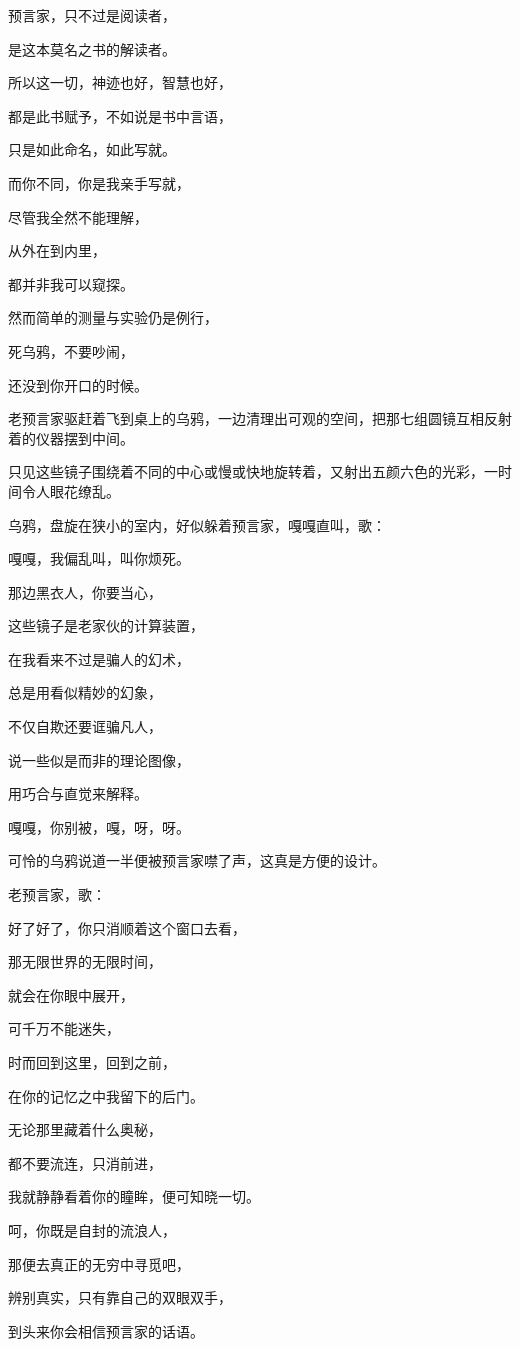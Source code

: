 \documentclass[UTF8]{article}
\begin{document}
\par 预言家，只不过是阅读者，
\par 是这本莫名之书的解读者。
\par 所以这一切，神迹也好，智慧也好，
\par 都是此书赋予，不如说是书中言语，
\par 只是如此命名，如此写就。
\par 而你不同，你是我亲手写就，
\par 尽管我全然不能理解，
\par 从外在到内里，
\par 都并非我可以窥探。
\par 然而简单的测量与实验仍是例行，
\par 死乌鸦，不要吵闹，
\par 还没到你开口的时候。
\\[0.6cm]
\par 老预言家驱赶着飞到桌上的乌鸦，一边清理出可观的空间，把那七组圆镜互相反射着的仪器摆到中间。
\par 只见这些镜子围绕着不同的中心或慢或快地旋转着，又射出五颜六色的光彩，一时间令人眼花缭乱。
\\[0.6cm]
\par 乌鸦，盘旋在狭小的室内，好似躲着预言家，嘎嘎直叫，歌：
\\[0.6cm]
\par 嘎嘎，我偏乱叫，叫你烦死。
\par 那边黑衣人，你要当心，
\par 这些镜子是老家伙的计算装置，
\par 在我看来不过是骗人的幻术，
\par 总是用看似精妙的幻象，
\par 不仅自欺还要诓骗凡人，
\par 说一些似是而非的理论图像，
\par 用巧合与直觉来解释。
\par 嘎嘎，你别被，嘎，呀，呀。
\\[0.6cm]
\par 可怜的乌鸦说道一半便被预言家噤了声，这真是方便的设计。
\\[0.6cm]
\par 老预言家，歌：
\\[0.6cm]
\par 好了好了，你只消顺着这个窗口去看，
\par 那无限世界的无限时间，
\par 就会在你眼中展开，
\par 可千万不能迷失，
\par 时而回到这里，回到之前，
\par 在你的记忆之中我留下的后门。
\par 无论那里藏着什么奥秘，
\par 都不要流连，只消前进，
\par 我就静静看着你的瞳眸，便可知晓一切。
\par 呵，你既是自封的流浪人，
\par 那便去真正的无穷中寻觅吧，
\par 辨别真实，只有靠自己的双眼双手，
\par 到头来你会相信预言家的话语。
\end{document}
